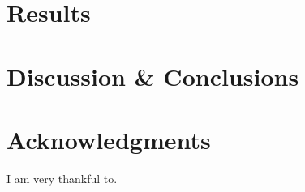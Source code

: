 \section{Results}
    \label{sec:res}




\section{Discussion \& Conclusions}
    \label{sec:disc}






\section*{Acknowledgments}
	I am very thankful to.

